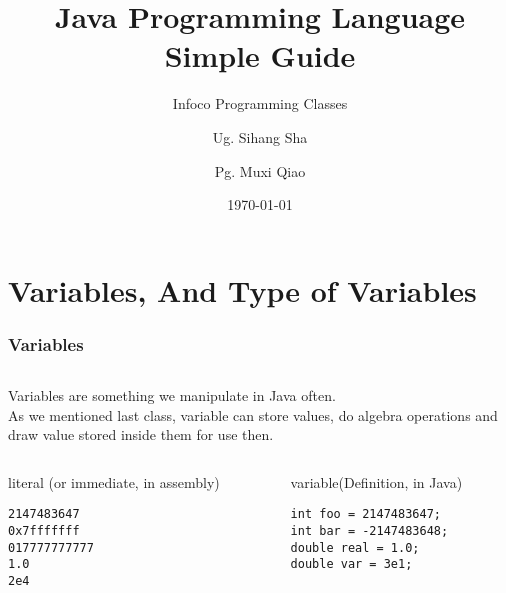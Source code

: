 \documentclass[en, 11pt, xcolor=dvipsnames]{beamer}
\title{Java Programming Language \\ Simple Guide} %
\subtitle{Infoco Programming Classes} %
\author{Ug. Sihang Sha \and Pg. Muxi Qiao} %
\institute{Xiann' Jiaotong Livepool University \\ \smallskip \textit{infoco@xjtlu.edu.cn}} %
\date{\today} %
\begin{document}
\maketitle



\section{Variables, And Type of Variables}
\begin{frame}[fragile]
	\frametitle{Variables}


	\begin{columns}[c]
		\begin{column}{0.9\textwidth}

			Variables are something we manipulate in Java often.\\

			As we mentioned last class, variable can store values, do algebra operations and draw value stored inside them for use then.

			\begin{columns}[c]
				\begin{column}{0.4\textwidth}

					literal (or immediate, in assembly)

					\begin{lstlisting}
2147483647
0x7fffffff
017777777777
1.0
2e4\end{lstlisting}

				\end{column}

				\begin{column}{0.4\textwidth}

					variable(Definition, in Java)

					\begin{lstlisting}
int foo = 2147483647;
int bar = -2147483648;
double real = 1.0;
double var = 3e1;\end{lstlisting}

				\end{column}
			\end{columns}

		\end{column}
	\end{columns}

\end{frame}
\end{document}
